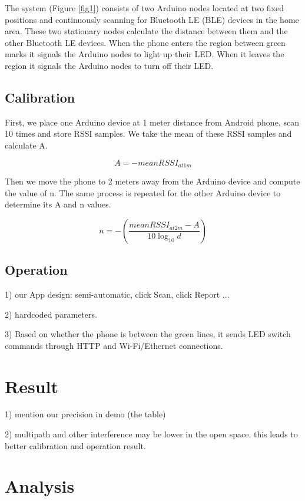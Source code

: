 \documentclass[conference,a4paper]{../../sty/IEEEtran}
\begin{document}
The system (Figure \ref{fig1}) consists of two Arduino nodes located at two fixed positions and continuously scanning for Bluetooth LE (BLE) devices in the home area. These two stationary nodes calculate the distance between them and the other Bluetooth LE devices.
When the phone enters the region between green marks it signals the Arduino nodes to light up their LED.
When it leaves the region it signals the Arduino nodes to turn off their LED.


\subsection{Calibration}

First, we place one Arduino device at 1 meter distance from Android phone, scan 10 times and store RSSI samples.
We take the mean of these RSSI samples and calculate A.

\begin{equation}
 A = -meanRSSI_{at 1m}
\end{equation}

Then we move the phone to 2 meters away from the Arduino device and compute the value of n.
The same process is repeated for the other Arduino device to determine its A and n values.

\begin{equation}
 n = -(\frac{ meanRSSI_{at 2m}-A}{10 \log_{10}d})
\end{equation}


\subsection{Operation}

1) our App design: semi-automatic, click Scan, click Report ...

2) hardcoded parameters.

3) Based on whether the phone is between the green lines, it sends LED switch commands through HTTP and Wi-Fi/Ethernet connections.


\section{Result}

1) mention our precision in demo (the table)

2) multipath and other interference may be lower in the open space. this leads to better calibration and operation result.

\section{Analysis}
\end{document}

